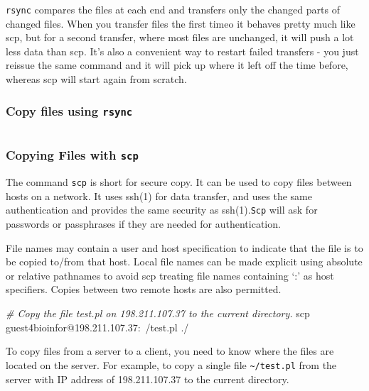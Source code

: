 \documentclass[]{book}
\makeatletter
\newenvironment{Shaded}{\begin{snugshade}}{\end{snugshade}}
\newcommand{\CommentTok}[1]{\textcolor[rgb]{0.56,0.35,0.01}{\textit{#1}}}
\newcommand{\FunctionTok}[1]{\textcolor[rgb]{0.00,0.00,0.00}{#1}}
\newcommand{\NormalTok}[1]{#1}
\newenvironment{kframe}{%
\medskip{}
\setlength{\fboxsep}{.8em}
 \def\at@end@of@kframe{}%
 \ifinner\ifhmode%
  \def\at@end@of@kframe{\end{minipage}}%
  \begin{minipage}{\columnwidth}%
 \fi\fi%
 \def\FrameCommand##1{\hskip\@totalleftmargin \hskip-\fboxsep
 \colorbox{shadecolor}{##1}\hskip-\fboxsep
     \hskip-\linewidth \hskip-\@totalleftmargin \hskip\columnwidth}%
 \MakeFramed {\advance\hsize-\width
   \@totalleftmargin\z@ \linewidth\hsize
   \@setminipage}}%
 {\par\unskip\endMakeFramed%
 \at@end@of@kframe}
\renewenvironment{Shaded}{\begin{kframe}}{\end{kframe}}
\makeatother
\begin{document}
\texttt{rsync} compares the files at each end and transfers only the changed parts of changed files. When you transfer files the first timeo it behaves pretty much like scp, but for a second transfer, where most files are unchanged, it will push a lot less data than scp. It's also a convenient way to restart failed transfers - you just reissue the same command and it will pick up where it left off the time before, whereas scp will start again from scratch.

\hypertarget{copy-files-using-rsync}{%
\subsubsection{\texorpdfstring{Copy files using \texttt{rsync}}{Copy files using rsync}}\label{copy-files-using-rsync}}

\begin{verbatim}
\end{verbatim}

\hypertarget{copying-files-with-scp}{%
\subsubsection{\texorpdfstring{Copying Files with \texttt{scp}}{Copying Files with scp}}\label{copying-files-with-scp}}

The command \texttt{scp} is short for secure copy. It can be used to copy files between hosts on a network. It uses ssh(1) for data transfer, and uses the same authentication and provides the same security as ssh(1).\texttt{Scp} will ask for passwords or passphrases if they are needed for authentication.

File names may contain a user and host specification to indicate that the file is to be copied to/from that host. Local file names can be made explicit using absolute or relative pathnames to avoid scp treating file names containing `:' as host specifiers. Copies between two remote hosts are also permitted.

\begin{Shaded}
\begin{Highlighting}[]
\CommentTok{# Copy the file test.pl on 198.211.107.37 to the current directory.}
\FunctionTok{scp}\NormalTok{ guest4bioinfor@198.211.107.37:~/test.pl ./}
\end{Highlighting}
\end{Shaded}

To copy files from a server to a client, you need to know where the files are located on the server. For example, to copy a single file \texttt{\textasciitilde{}/test.pl} from the server with IP address of 198.211.107.37 to the current directory.
\end{document}

